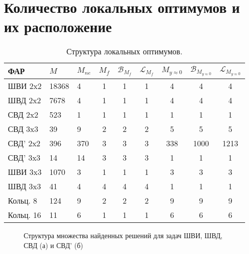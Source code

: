 \section{Количество локальных оптимумов и их расположение}\label{subsec:analyzeloc}
\begin{table}[!h]
\centering
\begin{tabular}{|l | l l | c c c | c c c|}
    \hline
    \textbf{ФАР} & \textbf{$M$} & \textbf{$M_{ne}$} & \textbf{$M_{f}$} & \textbf{$\mathcal{B}_{M_f}$} & \textbf{$\mathcal{L}_{M_f}$} & \textbf{$M_{y\approx0}$} & \textbf{$\mathcal{B}_{M_{y\approx0}}$} & \textbf{$\mathcal{L}_{M_{y\approx0}}$}\\
    \hline
    ШВИ 2x2 & 18368 & 4 & 1 & 1 & 1 & 4 & 4 & 4\\
    ШВД 2x2 & 7678  & 4 & 1 & 1 & 1 & 4 & 4 & 4\\
    СВД 2x2  & 523  & 1 & 1 & 1 & 1 & 1 & 1 & 1\\
    СВД 3x3  & 39  & 9 & 2 & 2 & 2 & 5 & 5 & 5\\
    СВД' 2x2  & 396  & 370 & 3 & 3 & 3 & 338 & 1000 & 1213\\
    СВД' 3x3  & 14  & 14 & 3 & 3 & 3 & 1 & 1 & 1\\
    ШВИ 3x3 & 1070  & 3 & 1 & 1 & 1 & 3 & 3 & 3 \\
    ШВД 3x3 & 41  & 4 & 4 & 4 & 4 & 1 & 1 & 1 \\
    Кольц. 8 & 124  & 9 & 2 & 2 & 2 & 9 & 9 & 9\\
    Кольц. 16 & 11  & 6 & 1 & 1 & 1& 6 & 6 & 6\\
    \hline
\end{tabular}
    \caption{Структура локальных оптимумов.}
    \label{tab:structure}
\end{table}

\begin{figure}
\centering
    \begin{minipage}[h]{0.8\linewidth}
    \end{minipage}
    \begin{minipage}[h]{0.8\linewidth}
    \end{minipage}
    \vspace{0.7em}
    \caption{Структура множества найденных решений для задач ШВИ, ШВД, СВД (а) и СВД' (б)}
    \label{ris:fit_dist}
\end{figure}

